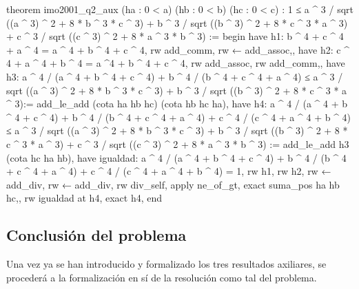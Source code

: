 \begin{leancode}
  theorem imo2001_q2_aux (ha : 0 < a) (hb : 0 < b) (hc : 0 < c) :
  1 ≤ a ^ 3 / sqrt ((a ^ 3) ^ 2 + 8 * b ^ 3 * c ^ 3) +
      b ^ 3 / sqrt ((b ^ 3) ^ 2 + 8 * c ^ 3 * a ^ 3) +
      c ^ 3 / sqrt ((c ^ 3) ^ 2 + 8 * a ^ 3 * b ^ 3) :=
begin
  have h1: b ^ 4 + c ^ 4 + a ^ 4 = a ^ 4 + b ^ 4 + c ^ 4,
  {rw add_comm,
   rw ← add_assoc,},
  have h2: c ^ 4 + a ^ 4 + b ^ 4 = a ^4 + b ^ 4 + c ^ 4,
  {rw add_assoc,
   rw add_comm,},
   have h3: a ^ 4 / (a ^ 4 + b ^ 4 + c ^ 4) + b ^ 4 / (b ^ 4 + c ^ 4 + a ^ 4) ≤  
    a ^ 3 / sqrt ((a ^ 3) ^ 2 + 8 * b ^ 3 * c ^ 3) + 
    b ^ 3 / sqrt ((b ^ 3) ^ 2 + 8 * c ^ 3 * a ^ 3):= 
    add_le_add (cota ha hb hc) (cota hb hc ha),
    have h4: a ^ 4 / (a ^ 4 + b ^ 4 + c ^ 4) + b ^ 4 / (b ^ 4 + c ^ 4 + a ^ 4) 
    + c ^ 4 / (c ^ 4 + a ^ 4 + b ^ 4) ≤  
    a ^ 3 / sqrt ((a ^ 3) ^ 2 + 8 * b ^ 3 * c ^ 3) + 
    b ^ 3 / sqrt ((b ^ 3) ^ 2 + 8 * c ^ 3 * a ^ 3) +
    c ^ 3 / sqrt ((c ^ 3) ^ 2 + 8 * a ^ 3 * b ^ 3) :=
    add_le_add h3 (cota hc ha hb),
    have igualdad: a ^ 4 / (a ^ 4 + b ^ 4 + c ^ 4) + b ^ 4 / (b ^ 4 + c ^ 4 + a ^ 4) 
    + c ^ 4 / (c ^ 4 + a ^ 4 + b ^ 4) = 1,
    {rw h1,
     rw h2,
     rw ← add_div,
     rw ← add_div,
     rw div_self,
     apply ne_of_gt,
     exact suma_pos ha hb hc,},
     rw igualdad at h4,
     exact h4,
end
\end{leancode}


\subsection{Conclusión del problema}
Una vez ya se han introducido y formalizado los tres resultados
axiliares, se procederá a la formalización en sí de la resolución
como tal del problema.